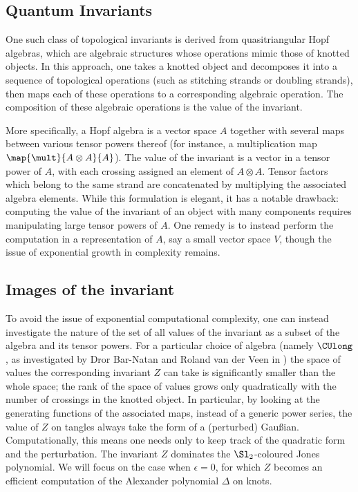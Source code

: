 \subsection{Quantum Invariants}

One such class of topological invariants is derived from quasitriangular Hopf
algebras, which are algebraic structures whose operations mimic those of knotted
objects. In this approach, one takes a knotted object and decomposes it into a
sequence of topological operations (such as stitching strands or doubling
strands), then maps each of these operations to a corresponding algebraic
operation. The composition of these algebraic operations is the value of the
invariant.

More specifically, a Hopf algebra is a vector space $A$ together with several
maps between various tensor powers thereof (for instance, a multiplication map
$\map {\mult} {A \otimes A} {A}$). The value of the invariant is a vector in a
tensor power of $A$, with each crossing assigned an element of $A \otimes A$.
Tensor factors which belong to the same strand are concatenated by multiplying
the associated algebra elements. While this formulation is elegant, it has a
notable drawback: computing the value of the invariant of an object with many
components requires manipulating large tensor powers of $A$. One remedy is to
instead perform the computation in a representation of $A$, say a small vector
space $V$, though the issue of exponential growth in complexity remains.

\subsection{Images of the invariant}
To avoid the issue of exponential computational complexity, one can instead
investigate the nature of the set of all values of the invariant as a subset of
the algebra and its tensor powers. For a particular choice of algebra (namely
$\CUlong$, as investigated by Dror Bar-Natan and Roland van der Veen in
\cite{BV}) the space of values the corresponding invariant $Z$ can take is
significantly smaller than the whole space; the rank of the space of values
grows only quadratically with the number of crossings in the knotted object. In
particular, by looking at the generating functions of the associated maps,
instead of a generic power series, the value of $Z$ on tangles always take the
form of a (perturbed) Gaußian. Computationally, this means one needs only to
keep track of the quadratic form and the perturbation. The invariant $Z$
dominates the $\Sl_2$-coloured Jones polynomial. We will focus on the case when
$ϵ=0$, for which $Z$ becomes an efficient computation of the Alexander
polynomial $Δ$ on knots.

